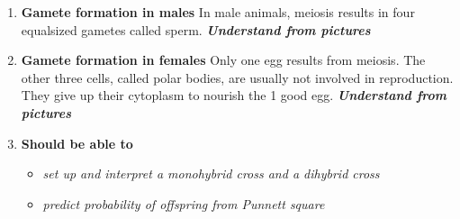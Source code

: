 \documentclass[9pt]{article}
\begin{document}
\begin{enumerate}
\begin{itemize}
    \item Homologous chromosomes form a tetrad
    \item Chromatids cross over one another
    \item The crossed sections of the chromatids are exchanged.
    \item Crossing-over produces new combinations of alleles.
  \end{itemize}
  {\bf \it Understand from pictures}
\item {\bf Gamete formation in males} In male animals, meiosis results
  in four equalsized gametes called sperm. {\bf \it Understand from
    pictures}
\item {\bf Gamete formation in females} Only one egg results from
  meiosis. The other three cells, called polar bodies, are usually not
  involved in reproduction.  They give up their cytoplasm to nourish
  the 1 good egg. {\bf \it Understand from pictures}
\item {\bf Should be able to}
  \begin{itemize}
    \item {\em set up and interpret a monohybrid cross and a dihybrid cross}
    \item {\em predict probability of offspring from Punnett square}
  \end{itemize}
\end{enumerate}
\end{document}
